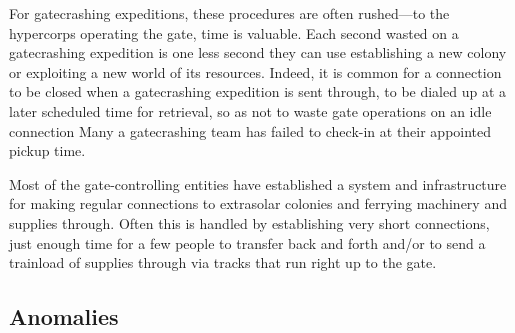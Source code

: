 For gatecrashing expeditions, these procedures are often rushed—to the hypercorps operating the gate, time is valuable. Each second wasted on a gatecrashing expedition is one less second they can use establishing a new colony or exploiting a new world of its resources. Indeed, it is common for a connection to be closed when a gatecrashing expedition is sent through, to be dialed up at a later scheduled time for retrieval, so as not to waste gate operations on an idle connection Many a gatecrashing team has failed to check-in at their appointed pickup time. 

Most of the gate-controlling entities have established a system and infrastructure for making regular connections to extrasolar colonies and ferrying machinery and supplies through. Often this is handled by establishing very short connections, just enough time for a few people to transfer back and forth and/or to send a trainload of supplies through via tracks that run right up to the gate. 

\subsection{Anomalies} 

